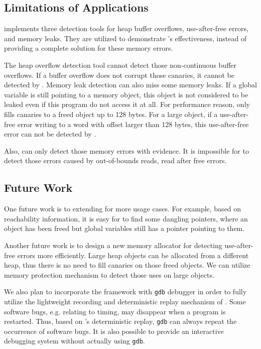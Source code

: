 \subsection{Limitations of Applications}
\doubletake{} implements three detection tools for heap buffer overflows, use-after-free errors, and memory leaks.  They are utilized to demonstrate \doubletake{}'s effectiveness, instead of providing a complete solution for these memory errors. 

The heap overflow detection tool cannot detect those non-continuous buffer overflows. If a buffer overflow does not corrupt those canaries, it cannot be detected by \doubletake{}. Memory leak detection can also miss some memory leaks. If a global variable is still pointing to a memory object, this object is not considered to be leaked even if this program do not access it at all. For performance reason, \doubletake{} only fills canaries to a freed object up to 128 bytes. For a large object, if a use-after-free error writing to a word with offset larger than 128 bytes, this use-after-free error can not be detected by \doubletake{}. 

Also, \doubletake{} can only detect those memory errors with evidence. It is impossible for \doubletake{} to detect those errors caused by out-of-bounds reads, read after free errors. 
 
\subsection{Future Work} 
One future work is to extending \doubletake{} for more usage cases. For example, based on reachability information, it is easy for \doubletake{} to find some dangling pointers, where an object has been freed but global variables still has a pointer pointing to them.

Another future work is to design a new memory allocator for detecting use-after-free errors more efficiently. Large heap objects can be allocated from a different heap, thus there is no need to fill canaries on those freed objects. We can utilize  memory protection mechanism to detect those uses on large objects.

We also plan to incorporate the \doubletake{} framework with \texttt{gdb} debugger in order to fully utilize the lightweight recording and deterministic replay mechanism of \doubletake{}. Some software bugs, e.g. relating to timing, may disappear when a program is restarted. Thus, based on \doubletake{}'s deterministic replay,  \texttt{gdb} can always repeat the occurrence of software bugs. It is also possible to provide an interactive debugging system without actually using \texttt{gdb}. 
